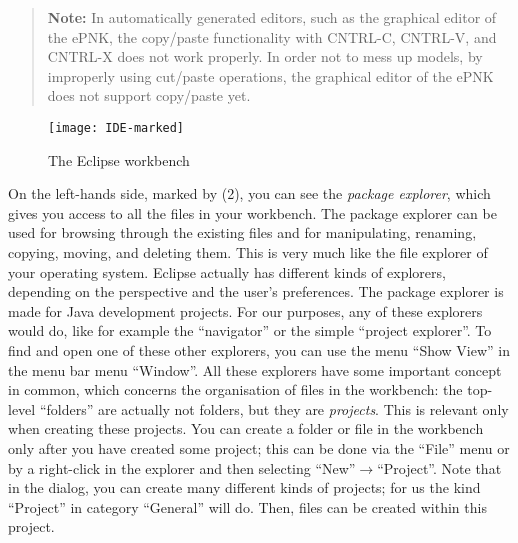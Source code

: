 \begin{quote}
{\bf Note:} In automatically generated editors, such as the graphical
editor of the ePNK, the copy/paste functionality with CNTRL-C, CNTRL-V, and
CNTRL-X does not work properly. In order not to mess up models, by improperly
using cut/paste operations, the graphical editor of the ePNK does
not support copy/paste yet.
\end{quote}

\begin{figure}[hbt!!]
  \centerline{\texttt{[image: IDE-marked]}}
  \caption{The Eclipse workbench}
  \label{fig:workbench}
\end{figure}

On the left-hands side, marked by (2), you can see the \emph{package explorer},%
which gives you access to all the files in your workbench. The package explorer
can be used for browsing through the existing files and for manipulating,
renaming, copying, moving, and deleting them. This is very much like the file
explorer of your operating system. Eclipse actually has different kinds of explorers,
depending on the perspective and the user's preferences. The package explorer is
made for Java development projects. For our purposes, any of these explorers
would do, like for example the ``navigator'' or the simple ``project explorer''.
To find and open one of these other explorers, you can use the menu ``Show View'' in the
menu bar menu ``Window''. All these explorers have some important concept
in common, which concerns the organisation of files in the workbench: the
top-level ``folders'' are actually not folders, but they are \emph{projects}.
This is relevant only when creating these projects. You can create a folder
or file in the workbench only after you have created some project; this can be
done via the ``File'' menu or by a right-click in the explorer and then
selecting ``New''$\rightarrow$``Project''. Note that in the dialog, you can
create many different kinds of projects; for us the kind ``Project'' in
category ``General'' will do. Then, files can be created within
this project. 

